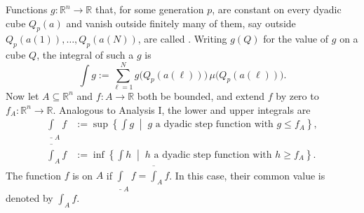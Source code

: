 \begin{definition}
\label{def:riemann_integral_rn}
Functions $g : \mathbb{R}^n \to \mathbb{R}$ that, for some generation $p$, are constant on every
dyadic cube $Q_p(a)$ and vanish outside finitely many of them, say outside
$Q_p(a(1)),\dots,Q_p(a(N))$, are called 
. Writing $g(Q)$ for the value of $g$ on a cube $Q$, the
integral of such a $g$ is
\[\int g := \sum_{\ell=1}^{N} g\big(Q_p(a(\ell))\big)\,\mu\big(Q_p(a(\ell))\big).\]
Now let $A \subseteq \mathbb{R}^n$ and $f : A \to \mathbb{R}$ both be bounded, and extend $f$ by
zero to $f_A : \mathbb{R}^n \to \mathbb{R}$. Analogous to Analysis I, the lower and upper
integrals are
\begin{align*}
  \underline{\int}_A f &:= \sup \left\{ \int g \;\middle|\; g \text{ a dyadic step function with } g \leq f_A \right\}, \\
  \overline{\int}_A f &:= \inf \left\{ \int h \;\middle|\; h \text{ a dyadic step function with } h \geq f_A \right\}.
\end{align*}
The function $f$ is  on $A$ if $\underline{\int}_A f = \overline{\int}_A f$. In this case, their common value is denoted by $\int_A f$.
\end{definition}


